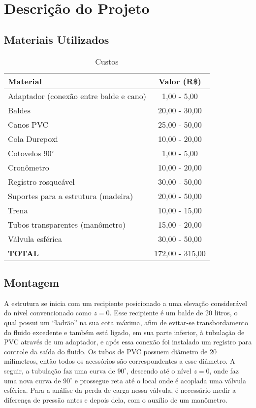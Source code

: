 \chapter{Descrição do Projeto}\label{descricao}

\section{Materiais Utilizados}

 \begin{table}[H]\label{t:custos}
     \centering
     \begin{tabular}{l c }
         \toprule
         \textbf{Material} & \textbf{Valor (R\$)} \\
         \midrule
         Adaptador (conexão entre balde e cano) & 1,00 - 5,00 \\
         Baldes & 20,00 - 30,00 \\
         Canos PVC & 25,00 - 50,00 \\
         Cola Durepoxi & 10,00 - 20,00 \\
         Cotovelos 90$^\circ$ & 1,00 - 5,00\\
         Cronômetro & 10,00 - 20,00 \\
         Registro rosqueável & 30,00 - 50,00 \\
         Suportes para a estrutura (madeira) & 20,00 - 50,00 \\
         Trena & 10,00 - 15,00 \\
         Tubos transparentes (manômetro) & 15,00 - 20,00 \\
         Válvula esférica & 30,00 - 50,00 \\
         \midrule
         \textbf{TOTAL} & 172,00 - 315,00\\
         \bottomrule
     \end{tabular}
     \caption{Custos}
 \end{table}

\section{Montagem}

A estrutura se inicia com um recipiente posicionado a uma elevação 
considerável do nível convencionado como $z = 0$. Esse
recipiente é um balde de 20 litros, o qual possui um ``ladrão''
na sua cota máxima, afim de evitar-se transbordamento do fluido excedente e também
está ligado, em sua parte inferior, 
à tubulação de PVC através de um
adaptador, e após essa conexão foi instalado um registro para controle da 
saída do fluido. Os tubos de PVC possuem diâmetro de 20 milímetros, então todos
os acessórios são correspondentes a esse diâmetro. A seguir, a tubulação faz
uma curva de $90^\circ$, descendo até o nível $z = 0$, 
onde faz uma nova curva de $90^\circ$
e prossegue reta até o local onde é
acoplada uma válvula esférica. Para a análise da perda de carga nessa válvula, é
necessário medir a diferença de pressão antes e depois dela, com o auxílio de um
manômetro.

